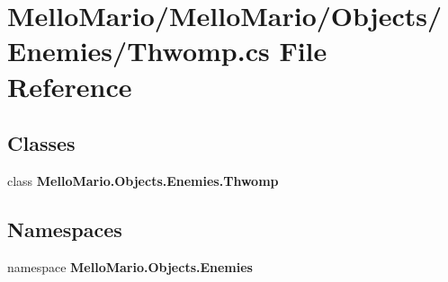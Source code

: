 \section{Mello\+Mario/\+Mello\+Mario/\+Objects/\+Enemies/\+Thwomp.cs File Reference}
\label{Thwomp_8cs}
\subsection*{Classes}
\begin{DoxyCompactItemize}
\item 
class \textbf{ Mello\+Mario.\+Objects.\+Enemies.\+Thwomp}
\end{DoxyCompactItemize}
\subsection*{Namespaces}
\begin{DoxyCompactItemize}
\item 
namespace \textbf{ Mello\+Mario.\+Objects.\+Enemies}
\end{DoxyCompactItemize}
